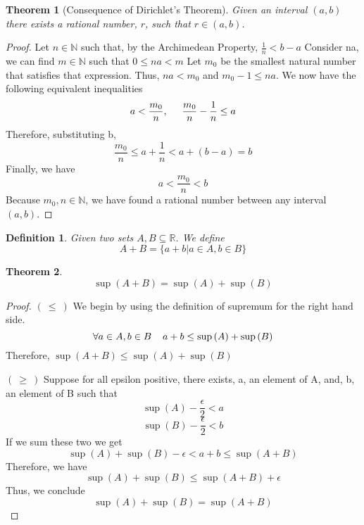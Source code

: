 \documentclass[12pt,reqno]{amsart}
\theoremstyle{plain}
\newtheorem*{definition}{Definition}
\newtheorem*{theorem}{Theorem}
\begin{document}
    \begin{theorem}[Consequence of Dirichlet's Theorem]
        Given an interval $(a,b)$ there exists a rational number, $r$, such that $r \in (a,b)$.
    \end{theorem}
    \begin{proof}
        Let $n \in \mathbb{N}$ such that, by the Archimedean Property, $\frac1n < b-a$
        Consider na, we can find $m \in \mathbb{N}$ such that $0 \le na < m$
        Let $m_0$ be the smallest natural number that satisfies that expression.
        Thus, $na < m_0$ and $m_0 - 1 \le na$. 
        We now have the following equivalent inequalities
        \[ a < \frac{m_0}{n}, \hspace{5 mm} \frac{m_0}{n} - \frac{1}{n} \le a\]
        Therefore, substituting b, 
        \[\frac{m_0}{n} \le a + \frac1n < a + (b-a) = b\]
        Finally, we have
        \[ a < \frac{m_0}{n} < b\]
        Because $m_0, n \in \mathbb{N}$, we have found a rational number between any interval $(a,b)$.
    \end{proof}

    \begin{definition}
        Given two sets $A,B \subseteq \mathbb{R}$. We define
        \[ A+B = \{ a + b \vert a \in A, b \in B \}\] 
    \end{definition}

    \begin{theorem}
        \[ \sup{(A+B)} = \sup{(A)} + \sup{(B)} \]
    \end{theorem}
    \begin{proof}
        $(\ \le\ )$ We begin by using the definition of supremum for the right hand side.
        \[ \forall a \in A,b \in B \hspace{4 mm} a + b \le \sup{(A)} + \sup{(B)}\]
        Therefore, $\sup(A+B) \le \sup(A) + \sup(B)$

        $(\ \ge\ )$ Suppose for all epsilon positive, there exists, a, an element of A, and, b, an element of B such that
        \[ \sup{(A)} - \frac{\epsilon}2 < a\]
        \[ \sup{(B)} - \frac{\epsilon}2 < b\]
        If we sum these two we get 
        \[ \sup{(A)} + \sup{(B)} - \epsilon < a + b \le \sup{(A+B)}\]
        Therefore, we have
        \[ \sup{(A)} + \sup{(B)} \le \sup{(A+B)} + \epsilon \]
        Thus, we conclude
        \[ \sup{(A)} + \sup{(B)} = \sup{(A+B)}\]
    \end{proof}
\end{document}
